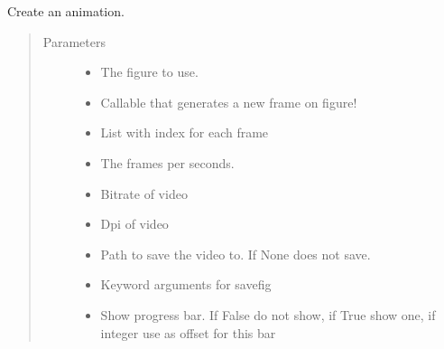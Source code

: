 \documentclass[letterpaper,10pt,openany,oneside,english]{sphinxmanual}
\begin{document}
\begin{fulllineitems}
\label{\detokenize{animation:animation.create_animation}}
Create an animation.
\begin{quote}\begin{description}
\item[{Parameters}] \leavevmode\begin{itemize}
\item {} 
 \textendash{} The figure to use.

\item {} 
 \textendash{} Callable that generates a new frame on figure!

\item {} 
 \textendash{} List with index for each frame

\item {} 
 \textendash{} The frames per seconds.

\item {} 
 \textendash{} Bitrate of video

\item {} 
 \textendash{} Dpi of video

\item {} 
 \textendash{} Path to save the video to. If None does not save.

\item {} 
 \textendash{} Keyword arguments for savefig

\item {} 
 \textendash{} Show progress bar. If False do not show, if True show one, if integer use as  
offset for this bar

\end{itemize}

\end{description}\end{quote}

\end{fulllineitems}
\end{document}
